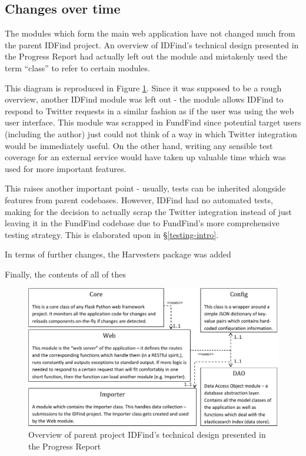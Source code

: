 \subsection{Changes over time}
The modules which form the main web application have not changed much from the parent IDFind project. An overview of IDFind's technical design presented in the Progress Report \cite{progress-report} had actually left out the  module and mistakenly used the term ``class'' to refer to certain modules.

This diagram is reproduced in Figure \ref{fig:idfind-uml}. Since it was supposed to be a rough overview, another IDFind module was left out - the  module allows IDFind to respond to Twitter requests in a similar fashion as if the user was using the web user interface. This module was scrapped in FundFind since potential target users (including the author) just could not think of a way in which Twitter integration would be immediately useful. On the other hand, writing any sensible test coverage for an external service would have taken up valuable time which was used for more important features.

This raises another important point - usually, tests can be inherited alongside features from parent codebases. However, IDFind had no automated tests, making for the decision to actually scrap the Twitter integration instead of just leaving it in the FundFind codebase due to FundFind's more comprehensive testing strategy. This is elaborated upon in \S\ref{testing-intro}.

In terms of further changes, the Harvesters package was added

Finally, the contents of all of thes

\begin{figure}[H]
\centering
\includegraphics[width=1.00\textwidth,]{Chapter3/idfind-uml.pdf}
\caption{Overview of parent project IDFind's technical design presented in the Progress Report \cite{progress-report}}
\label{fig:idfind-uml}
\end{figure}

